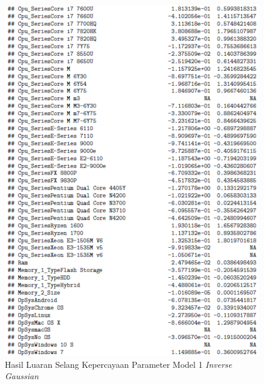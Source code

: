 \documentclass[12pt]{article}
\begin{document}
\begin{figure}[h!]
    \centering
    \includegraphics{Model_2_CI(3_5).png}
    \caption{Hasil Luaran Selang Kepercayaan Parameter Model 1 \textit{Inverse Gaussian}}
    \label{fig:CI23}
\end{figure}
\end{document}

